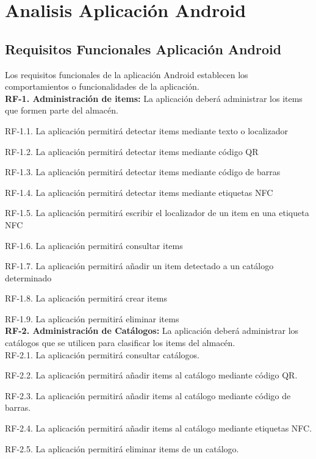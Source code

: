 \documentclass[a4paper,11pt]{book}
\begin{document}
\section{Analisis Aplicación Android}

\subsection{Requisitos Funcionales Aplicación Android}
Los requisitos funcionales de la aplicación Android establecen los comportamientos o funcionalidades de la aplicación.\\

\textbf{RF-1. Administración de items:} La aplicación deberá administrar los items que formen parte del almacén.   

RF-1.1. La aplicación permitirá detectar items mediante texto o localizador
	
RF-1.2. La aplicación permitirá detectar items mediante código QR
	
RF-1.3. La aplicación permitirá detectar items mediante código de barras
	
RF-1.4. La aplicación permitirá detectar items mediante etiquetas NFC
	
RF-1.5. La aplicación permitirá escribir el localizador de un item en una etiqueta NFC
	
RF-1.6. La aplicación permitirá consultar items
	
RF-1.7. La aplicación permitirá añadir un item detectado a un catálogo determinado
	
RF-1.8. La aplicación permitirá crear items

RF-1.9. La aplicación permitirá eliminar items\\


\textbf{RF-2. Administración de Catálogos:} La aplicación deberá administrar los catálogos que se utilicen para clasificar los items del almacén.\\   

 
	RF-2.1. La aplicación permitirá consultar catálogos.
	
	RF-2.2. La aplicación permitirá añadir items  al catálogo mediante código QR.
	
	RF-2.3. La aplicación permitirá añadir items al catálogo mediante código de barras.

	RF-2.4. La aplicación permitirá añadir items al catálogo mediante etiquetas NFC.
	
	RF-2.5. La aplicación permitirá eliminar items de un catálogo.
	
\end{document}
